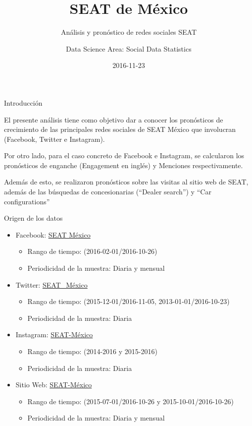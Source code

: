\documentclass[ignorenonframetext,]{beamer}
\title{SEAT de México}
\subtitle{Análisis y pronóstico de redes sociales SEAT}
\author{Data Science Area: Social Data Statistics}
\date{2016-11-23}
\providecommand{\tightlist}{%
  \setlength{\itemsep}{0pt}\setlength{\parskip}{0pt}}
\begin{document}
\frame{\titlepage}

\begin{frame}{Introducción}

El presente análisis tiene como objetivo dar a conocer los pronósticos
de crecimiento de las principales redes sociales de SEAT México que
involucran (Facebook, Twitter e Instagram).

Por otro lado, para el caso concreto de Facebook e Instagram, se
calcularon los pronósticos de enganche (Engagement en inglés) y
Menciones respectivamente.

Además de esto, se realizaron pronósticos sobre las visitas al sitio web
de SEAT, además de las búsquedas de concesionarias (``Dealer search'') y
``Car configurations''

\end{frame}

\begin{frame}{Origen de los datos}

\begin{itemize}
\tightlist
\item
  Facebook: \href{https://www.facebook.com/SEAT.Mexico}{SEAT México}

  \begin{itemize}
  \tightlist
  \item
    Rango de tiempo: (2016-02-01/2016-10-26)
  \item
    Periodicidad de la muestra: Diaria y mensual
  \end{itemize}
\item
  Twitter: \href{https://twitter.com/SEAT_Mexico}{SEAT\_México}

  \begin{itemize}
  \tightlist
  \item
    Rango de tiempo: (2015-12-01/2016-11-05, 2013-01-01/2016-10-23)
  \item
    Periodicidad de la muestra: Diaria
  \end{itemize}
\item
  Instagram:
  \href{https://www.instagram.com/seatmexico/?hl=es}{SEAT-México}

  \begin{itemize}
  \tightlist
  \item
    Rango de tiempo: (2014-2016 y 2015-2016)
  \item
    Periodicidad de la muestra: Diaria
  \end{itemize}
\item
  Sitio Web: \href{http://www.seat.mx/}{SEAT-México}

  \begin{itemize}
  \tightlist
  \item
    Rango de tiempo: (2015-07-01/2016-10-26 y 2015-10-01/2016-10-26)
  \item
    Periodicidad de la muestra: Diaria y mensual
  \end{itemize}
\end{itemize}

\end{frame}
\end{document}
